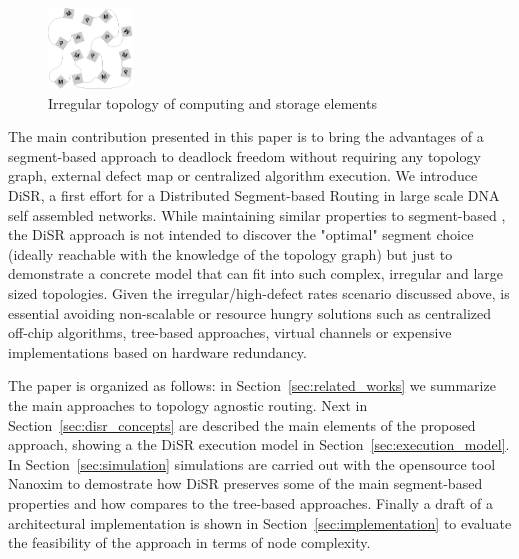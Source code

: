 \begin{figure}
  \centering
    \includegraphics[width=0.20\textwidth]{pictures/dna1.eps}
  \caption{Irregular topology of computing and storage elements}
  \label{fig:nana}
\end{figure}

The main contribution presented in this paper is to bring the advantages of
a segment-based approach to deadlock freedom without requiring any topology graph,
external defect map or centralized algorithm execution.  We introduce DiSR, a first effort for a Distributed
Segment-based Routing in large scale DNA self assembled networks.
While maintaining similar properties to segment-based , the DiSR
approach is not intended to discover the "optimal" segment choice
(ideally reachable with the knowledge of the topology graph) but just
to demonstrate a concrete model that can fit into such complex,
irregular and large sized topologies.
Given the irregular/high-defect rates scenario discussed above, is essential
avoiding non-scalable or resource hungry solutions such as
centralized off-chip algorithms, tree-based approaches, virtual channels
or expensive implementations based on hardware redundancy.

The paper is organized as follows: in Section~\ref{sec:related_works}
we summarize the main approaches to topology agnostic routing. Next in
Section~\ref{sec:disr_concepts} are described the main elements of the
proposed approach, showing a the DiSR execution model in
Section~\ref{sec:execution_model}.  In Section~\ref{sec:simulation}
simulations are carried out with the opensource tool Nanoxim to
demostrate how DiSR preserves some of the main segment-based
properties and how compares to the tree-based approaches. Finally a
draft of a architectural implementation is shown in
Section~\ref{sec:implementation} to evaluate the feasibility of the
approach in terms of node complexity.

